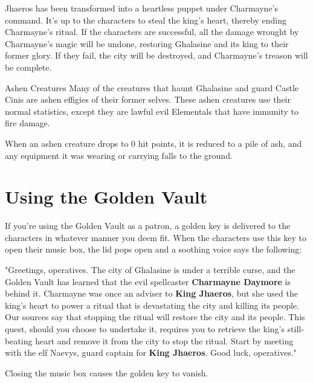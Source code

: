 \documentclass[10pt,a4paper,twoside,bg=print,twocolumn,openany,nodeprecatedcode]{dndbook}
\begin{document}
Jhaeros has been transformed into a heartless puppet under Charmayne's command. It's up to the characters to steal the king's heart, thereby ending Charmayne's ritual. If the characters are successful, all the damage wrought by Charmayne's magic will be undone, restoring Ghalasine and its king to their former glory. If they fail, the city will be destroyed, and Charmayne's treason will be complete.

\begin{DndSidebar}[float=!b]{Ashen Creatures}
Many of the creatures that haunt Ghalasine and guard Castle Cinis are ashen effigies of their former selves. These ashen creatures use their normal statistics, except they are lawful evil Elementals that have immunity to fire damage.



When an ashen creature drops to 0 hit points, it is reduced to a pile of ash, and any equipment it was wearing or carrying falls to the ground.



\end{DndSidebar}

\section{Using the Golden Vault}
If you're using the Golden Vault as a patron, a golden key is delivered to the characters in whatever manner you deem fit. When the characters use this key to open their music box, the lid pops open and a soothing voice says the following:

\begin{DndReadAloud}{}
"Greetings, operatives. The city of Ghalasine is under a terrible curse, and the Golden Vault has learned that the evil spellcaster \textbf{Charmayne Daymore} is behind it. Charmayne was once an adviser to \textbf{King Jhaeros}, but she used the king's heart to power a ritual that is devastating the city and killing its people. Our sources say that stopping the ritual will restore the city and its people. This quest, should you choose to undertake it, requires you to retrieve the king's still-beating heart and remove it from the city to stop the ritual. Start by meeting with the elf Naevys, guard captain for \textbf{King Jhaeros}. Good luck, operatives."

\end{DndReadAloud}

Closing the music box causes the golden key to vanish.
\end{document}
